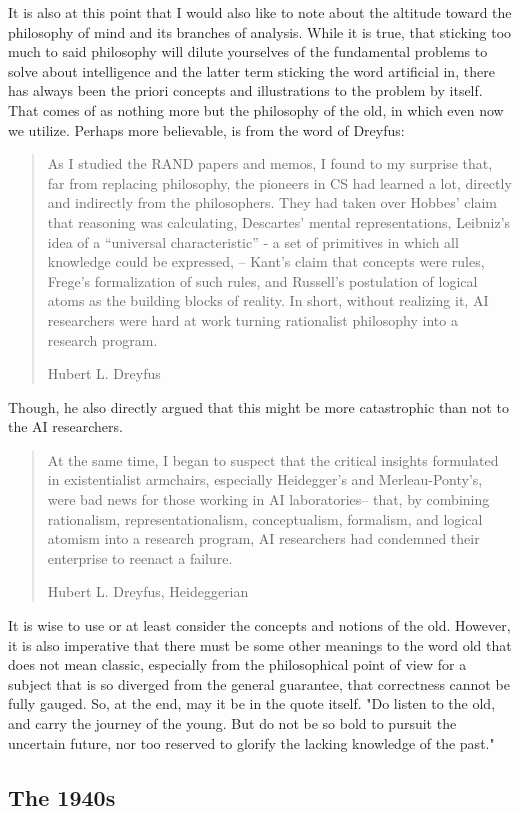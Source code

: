 It is also at this point that I would also like to note about the altitude toward the philosophy of mind and its branches of analysis. While it is true, that sticking too much to said philosophy will dilute yourselves of the fundamental problems to solve about intelligence and the latter term sticking the word artificial in, there has always been the priori concepts and illustrations to the problem by itself. That comes of as nothing more but the philosophy of the old, in which even now we utilize. Perhaps more believable, is from the word of Dreyfus: 
\blockquote[Hubert L. Dreyfus]{As I studied the RAND papers and memos, I found to my surprise that, far from replacing philosophy, the pioneers in CS had learned a lot, directly and indirectly from the philosophers. They had taken over Hobbes' claim that reasoning was calculating, Descartes' mental representations, Leibniz's idea of a “universal characteristic” - a set of primitives in which all knowledge could be expressed, -- Kant's claim that concepts were rules, Frege's formalization of such rules, and Russell's postulation of logical atoms as the building blocks of reality. In short, without realizing it, AI researchers were hard at work turning rationalist philosophy into a research program.}

Though, he also directly argued that this might be more catastrophic than not to the AI researchers. 
\blockquote[Hubert L. Dreyfus, Heideggerian]{At the same time, I began to suspect that the critical insights formulated in existentialist armchairs, especially Heidegger's and Merleau-Ponty's, were bad news for those working in AI laboratories-- that, by combining rationalism, representationalism, conceptualism, formalism, and logical atomism into a research program, AI researchers had condemned their enterprise to reenact a failure.}

It is wise to use or at least consider the concepts and notions of the old. However, it is also imperative that there must be some other meanings to the word old that does not mean classic, especially from the philosophical point of view for a subject that is so diverged from the general guarantee, that correctness cannot be fully gauged. So, at the end, may it be in the quote itself. "Do listen to the old, and carry the journey of the young. But do not be so bold to pursuit the uncertain future, nor too reserved to glorify the lacking knowledge of the past."

\subsection{The 1940s}


